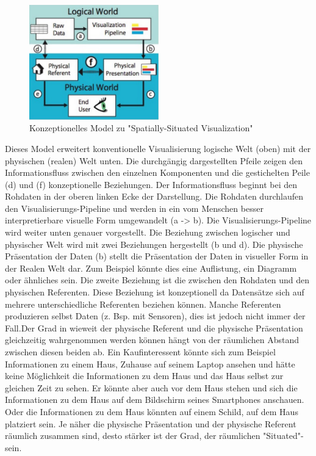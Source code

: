 \begin{figure}[H]
	\centering
	\includegraphics[width=0.5\textwidth]{resources/fundamentals/situated_visualization/spacially_situated_visualization_model.png}
	\caption{Konzeptionelles Model zu "Spatially-Situated Visualization" \cite{example_situated_visualization_concept}}
	\label{img:situated_visualization_concept}
\end{figure}

Dieses Model erweitert konventionelle Visualisierung logische Welt (oben) mit der physischen (realen) Welt unten. Die durchgängig dargestellten Pfeile zeigen den Informationsfluss zwischen den 
einzelnen Komponenten und die gestichelten Peile (d) und (f)  konzeptionelle Beziehungen. Der Informationsfluss beginnt bei den Rohdaten in der oberen linken Ecke der Darstellung. Die Rohdaten durchlaufen den 
Visualisierungs-Pipeline und werden in ein vom Menschen besser interpretierbare visuelle Form umgewandelt (a -> b). Die Visualisierungs-Pipeline wird weiter unten genauer vorgestellt. 
Die Beziehung zwischen logischer und physischer Welt wird mit zwei Beziehungen hergestellt (b und d).  Die physische Präsentation der Daten (b) stellt die Präsentation der Daten in visueller Form in der Realen Welt dar. 
Zum Beispiel könnte dies eine Auflistung, ein Diagramm oder ähnliches sein. Die zweite Beziehung ist die zwischen den Rohdaten und den physischen Referenten. Diese Beziehung ist konzeptionell da Datensätze sich auf mehrere unterschiedliche Referenten beziehen können. Manche Referenten produzieren selbst Daten (z. Bsp. mit Sensoren), dies ist jedoch nicht immer der Fall.Der Grad in wieweit der physische Referent und die physische Präsentation gleichzeitig wahrgenommen werden können hängt von der räumlichen Abstand zwischen diesen beiden ab. Ein Kaufinteressent könnte sich zum Beispiel Informationen zu einem Haus, Zuhause auf seinem Laptop ansehen und hätte keine Möglichkeit die Informationen zu dem Haus und das Haus selbst zur gleichen Zeit zu sehen. Er könnte aber auch vor dem Haus stehen und sich die Informationen zu dem Haus auf dem Bildschirm seines Smartphones anschauen. Oder die Informationen zu dem Haus könnten auf einem Schild, auf dem Haus platziert sein. Je näher die physische Präsentation und der physische Referent räumlich zusammen sind, desto stärker ist der Grad, der räumlichen "Situated"-sein. 

